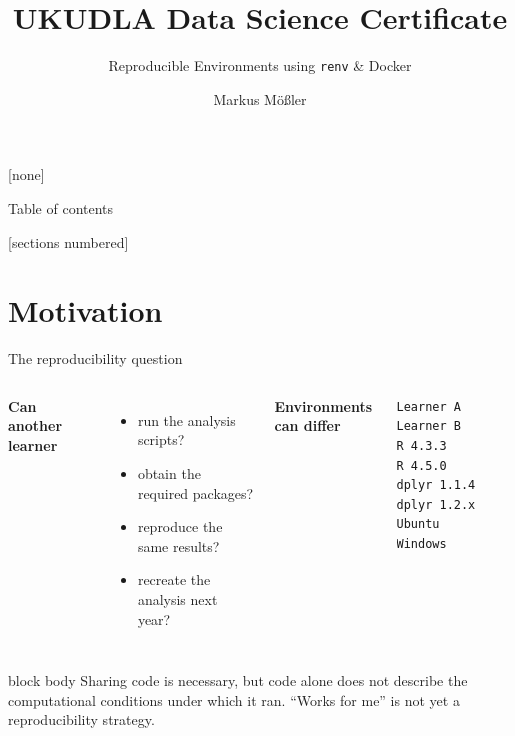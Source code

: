 \documentclass[10pt,aspectratio=169]{beamer}
\title{UKUDLA Data Science Certificate}
\subtitle{Reproducible Environments using \texttt{renv} \& Docker}
\author{Markus Mößler}
\institute{University of Hohenheim}
\begin{document}
\maketitle

{
[none]

\begin{frame}[noframenumbering]{Table of contents}

  \small
  [sections numbered]
  \tableofcontents[hideallsubsections]

\end{frame}
}


\section{Motivation}


\begin{frame}[fragile]{The reproducibility question}

\small

\begin{columns}[T]


\textbf{Can another learner}

\begin{itemize}
  \item run the analysis scripts?
  \item obtain the required packages?
  \item reproduce the same results?
  \item recreate the analysis next year?
\end{itemize}


\textbf{Environments can differ}

\begin{verbatim}
Learner A       Learner B
R 4.3.3         R 4.5.0
dplyr 1.1.4     dplyr 1.2.x
Ubuntu          Windows
\end{verbatim}

\end{columns}

\vspace{0.25cm}

\begin{beamercolorbox}[rounded=true,sep=9pt]{block body}
Sharing code is necessary, but code alone does not describe the computational conditions under which it ran. ``Works for me'' is not yet a reproducibility strategy.
\end{beamercolorbox}

\end{frame}
\end{document}
